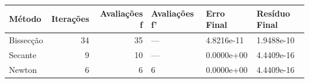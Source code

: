 \begin{tabular}{lrrlll}
\toprule
Método & Iterações & Avaliações f & Avaliações f' & Erro Final & Resíduo Final \\
\midrule
Bissecção & 34 & 35 & — & 4.8216e-11 & 1.9488e-10 \\
Secante & 9 & 10 & — & 0.0000e+00 & 4.4409e-16 \\
Newton & 6 & 6 & 6 & 0.0000e+00 & 4.4409e-16 \\
\bottomrule
\end{tabular}
